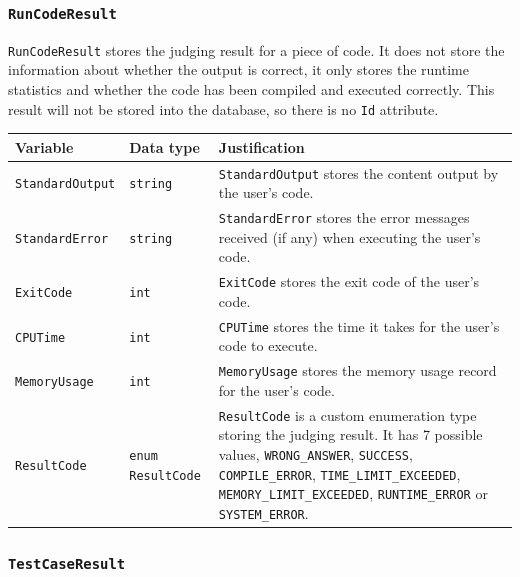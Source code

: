 \documentclass[a4paper]{report}
\begin{document}
\subsubsection{\texttt{RunCodeResult}}

\texttt{RunCodeResult} stores the judging result for a piece of code. It does not store the information about whether the output is correct, it only stores the runtime statistics and whether the code has been compiled and executed correctly. This result will not be stored into the database, so there is no \texttt{Id} attribute.

\begin{tabulary}{\textwidth}{|l|l|L|}
    \hline
    Variable & Data type & Justification \\
    \hline
    \texttt{StandardOutput} & \texttt{string} & \texttt{StandardOutput} stores the content output by the user's code. \\
    \hline
    \texttt{StandardError} & \texttt{string} & \texttt{StandardError} stores the error messages received (if any) when executing the user's code. \\
    \hline
    \texttt{ExitCode} & \texttt{int} & \texttt{ExitCode} stores the exit code of the user's code. \\
    \hline
    \texttt{CPUTime} & \texttt{int} & \texttt{CPUTime} stores the time it takes for the user's code to execute. \\
    \hline
    \texttt{MemoryUsage} & \texttt{int} & \texttt{MemoryUsage} stores the memory usage record for the user's code. \\
    \hline
    \texttt{ResultCode} & \texttt{enum ResultCode} & \texttt{ResultCode} is a custom enumeration type storing the judging result. It has 7 possible values, \texttt{WRONG_ANSWER}, \texttt{SUCCESS}, \texttt{COMPILE_ERROR}, \texttt{TIME_LIMIT_EXCEEDED}, \texttt{MEMORY_LIMIT_EXCEEDED}, \texttt{RUNTIME_ERROR} or \texttt{SYSTEM_ERROR}. \\
    \hline
\end{tabulary}

\subsubsection{\texttt{TestCaseResult}}
\end{document}
